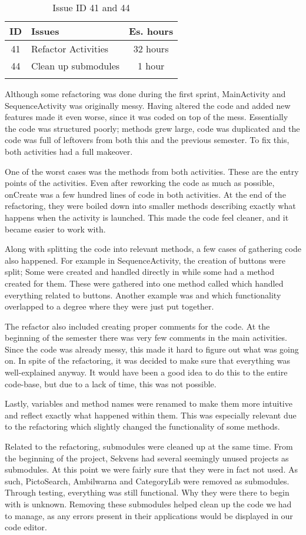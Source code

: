 \begin{longtable} { | c | p{12cm} | c | } 
\hline
	ID 	&	Issues	&		 Es. hours \\\hline
	41	&	Refactor Activities	&	32 hours	\\\hline
	44	&	Clean up submodules &	1 hour	\\\hline
\caption{Issue ID 41 and 44}
\label{tab:spr4_refactoroverview}
\end{longtable}

Although some refactoring was done during the first sprint, MainActivity and SequenceActivity was originally messy. Having altered the code and added new features made it even worse, since it was coded on top of the mess. Essentially the code was structured poorly; methods grew large, code was duplicated and the code was full of leftovers from both this and the previous semester. To fix this, both activities had a full makeover.

One of the worst cases was the  methods from both activities. These are the entry points of the activities. Even after reworking the code as much as possible, onCreate was a few hundred lines of code in both activities. At the end of the refactoring, they were boiled down into smaller methods describing exactly what happens when the activity is launched. This made the code feel cleaner, and it became easier to work with. 

Along with splitting the code into relevant methods, a few cases of gathering code also happened. For example in SequenceActivity, the creation of buttons were split; Some were created and handled directly in  while some had a method created for them. These were gathered into one method called  which handled everything related to buttons. Another example was  and  which functionality overlapped to a degree where they were just put together.

The refactor also included creating proper comments for the code. At the beginning of the semester there was very few comments in the main activities. Since the code was already messy, this made it hard to figure out what was going on. In spite of the refactoring, it was decided to make sure that everything was well-explained anyway. It would have been a good idea to do this to the entire code-base, but due to a lack of time, this was not possible.

Lastly, variables and method names were renamed to make them more intuitive and reflect exactly what happened within them. This was especially relevant due to the refactoring which slightly changed the functionality of some methods.

Related to the refactoring, submodules were cleaned up at the same time. From the beginning of the project, Sekvens had several seemingly unused projects as submodules. At this point we were fairly sure that they were in fact not used. As such, PictoSearch, Ambilwarna and CategoryLib were removed as submodules. Through testing, everything was still functional. Why they were there to begin with is unknown. Removing these submodules helped clean up the code we had to manage, as any errors present in their applications would be displayed in our code editor.